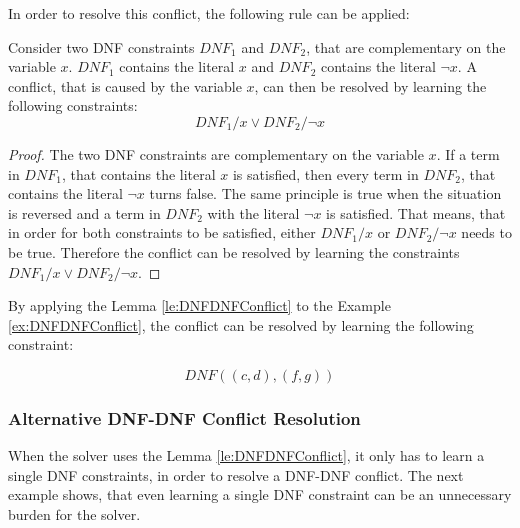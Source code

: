 In order to resolve this conflict, the following rule can be applied:

\begin{lemma}
\begin{leftbar}
Consider two DNF constraints $DNF_1$ and $DNF_2$, that are complementary on the variable $x$. $DNF_1$ contains the literal $x$ and $DNF_2$ contains the literal $\neg x$. A conflict, that is caused by the variable $x$, can then be resolved by learning the following constraints:
\begin{displaymath}
DNF_1 / x \vee DNF_2 / \neg x
\end{displaymath}
\end{leftbar}
\label{le:DNFDNFConflict}
\end{lemma}

\begin{proof}
The two DNF constraints are complementary on the variable $x$. If a term in $DNF_1$, that contains the literal $x$ is satisfied, then every term in $DNF_2$, that contains the literal $\neg x$ turns false. The same principle is true when the situation is reversed and a term in $DNF_2$ with the literal $\neg x$ is satisfied. That means, that in order for both constraints to be satisfied, either $DNF_1/x$ or $DNF_2/\neg x$ needs to be true. Therefore the conflict can be resolved by learning the constraints $DNF_1 / x \vee DNF_2 / \neg x$.
\end{proof}

By applying the Lemma \ref{le:DNFDNFConflict} to the Example \ref{ex:DNFDNFConflict}, the conflict can be resolved by learning the following constraint:
\begin{leftbar}
\begin{displaymath}
 DNF ((c,d),(f,g))
\end{displaymath}
\end{leftbar}

\newpage
\subsubsection{Alternative DNF-DNF Conflict Resolution}

When the solver uses the Lemma \ref{le:DNFDNFConflict}, it only has to learn a single DNF constraints, in order to resolve a DNF-DNF conflict. The next example shows, that even learning a single DNF constraint can be an unnecessary burden for the solver.

